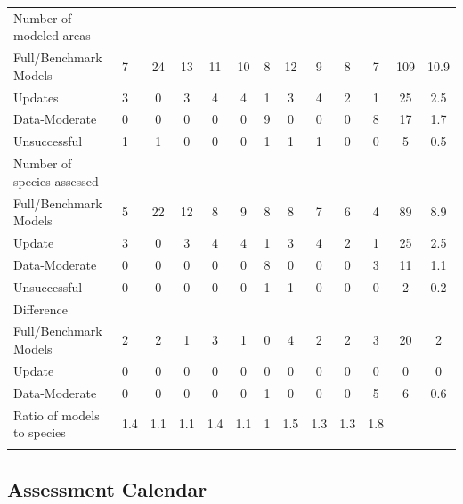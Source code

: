 \documentclass[11pt,
  english,
  a4paper,
]{article}
\begin{document}
\begin{landscape}
\begin{longtable}[t]{>{\raggedright\arraybackslash}p{6cm}lccccccccccc}
\endfoot
\bottomrule
\endlastfoot
Number of modeled areas &  &  &  &  &  &  &  &  &  &  &  & \\
\hspace{3mm}Full/Benchmark Models & 7 & 24 & 13 & 11 & 10 & 8 & 12 & 9 & 8 & 7 & 109 & 10.9\\
\hspace{3mm}Updates & 3 & 0 & 3 & 4 & 4 & 1 & 3 & 4 & 2 & 1 & 25 & 2.5\\
\hspace{3mm}Data-Moderate & 0 & 0 & 0 & 0 & 0 & 9 & 0 & 0 & 0 & 8 & 17 & 1.7\\
\hspace{3mm}Unsuccessful & 1 & 1 & 0 & 0 & 0 & 1 & 1 & 1 & 0 & 0 & 5 & 0.5\\
Number of species assessed &  &  &  &  &  &  &  &  &  &  &  & \\
\hspace{3mm}Full/Benchmark Models & 5 & 22 & 12 & 8 & 9 & 8 & 8 & 7 & 6 & 4 & 89 & 8.9\\
\hspace{3mm}Update & 3 & 0 & 3 & 4 & 4 & 1 & 3 & 4 & 2 & 1 & 25 & 2.5\\
\hspace{3mm}Data-Moderate & 0 & 0 & 0 & 0 & 0 & 8 & 0 & 0 & 0 & 3 & 11 & 1.1\\
\hspace{3mm}Unsuccessful & 0 & 0 & 0 & 0 & 0 & 1 & 1 & 0 & 0 & 0 & 2 & 0.2\\
Difference &  &  &  &  &  &  &  &  &  &  &  & \\
\hspace{3mm}Full/Benchmark Models & 2 & 2 & 1 & 3 & 1 & 0 & 4 & 2 & 2 & 3 & 20 & 2\\
\hspace{3mm}Update & 0 & 0 & 0 & 0 & 0 & 0 & 0 & 0 & 0 & 0 & 0 & 0\\
\hspace{3mm}Data-Moderate & 0 & 0 & 0 & 0 & 0 & 1 & 0 & 0 & 0 & 5 & 6 & 0.6\\
Ratio of models to species & 1.4 & 1.1 & 1.1 & 1.4 & 1.1 & 1 & 1.5 & 1.3 & 1.3 & 1.8 &  & \\*
\end{longtable}
\leavevmode\tagmcend\tagstructend\par
\endgroup{}
\end{landscape}
\endgroup{}


\hypertarget{assessment-calendar}{%
\subsection{Assessment Calendar}\label{assessment-calendar}}
\end{document}
